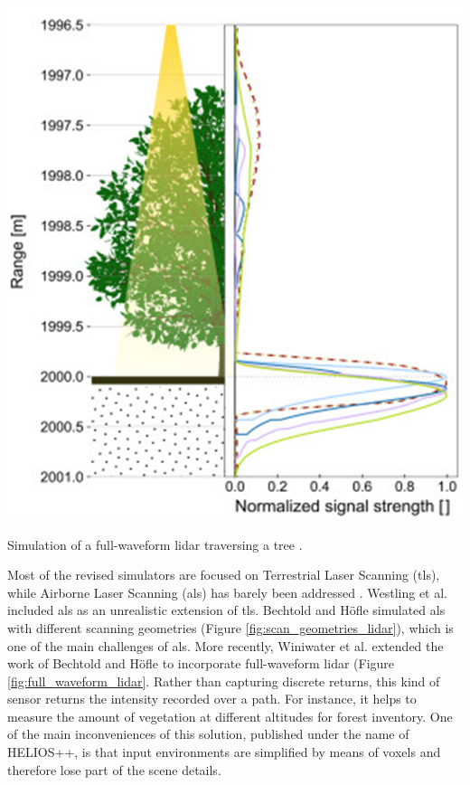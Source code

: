 \begin{marginfigure}[.0cm]
	\includegraphics{figs/context/waveform_lidar.png}
	\caption{Simulation of a full-waveform \acrshort{lidar} traversing a tree \cite{winiwarter_virtual_2022}.}
	\label{fig:full_waveform_lidar}
\end{marginfigure}
Most of the revised simulators are focused on Terrestrial Laser Scanning (\acrshort{tls}), while Airborne Laser Scanning (\acrshort{als}) has barely been addressed \cite{winiwarter_virtual_2022}. Westling et al. \cite{westling_simtreels_2020} included \acrshort{als} as an unrealistic extension of \acrshort{tls}. Bechtold and Höfle \cite{bechtold_helios_2016} simulated \acrshort{als} with different scanning geometries (Figure \ref{fig:scan_geometries_lidar}), which is one of the main challenges of \acrshort{als}. More recently, Winiwater et al. \cite{winiwarter_virtual_2022} extended the work of Bechtold and Höfle to incorporate full-waveform \acrshort{lidar} (Figure \ref{fig:full_waveform_lidar}. Rather than capturing discrete returns, this kind of sensor returns the intensity recorded over a path. For instance, it helps to measure the amount of vegetation at different altitudes for forest inventory. One of the main inconveniences of this solution, published under the name of HELIOS++, is that input environments are simplified by means of voxels and therefore lose part of the scene details.


